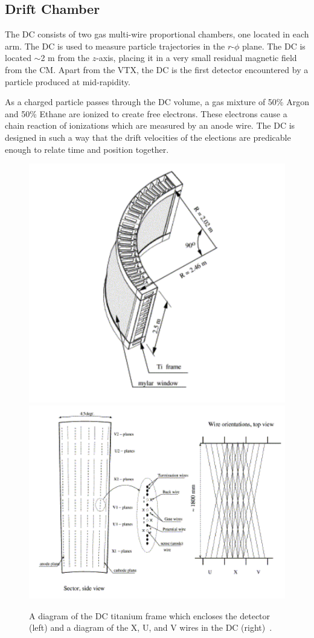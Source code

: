 \subsection{Drift Chamber}
The DC consists of two gas multi-wire proportional chambers, one located in each arm. The DC is used to measure particle trajectories in the $r$-$\phi$ plane.
The DC is located $\sim$2 m from the $z$-axis, placing it in a very small residual magnetic field from the CM. Apart from the VTX, the DC is the first detector encountered by a particle produced at mid-rapidity. 

As a charged particle passes through the DC volume, a gas mixture of 50\% Argon and 50\% Ethane are ionized to create free electrons. These electrons cause a chain reaction of ionizations which are measured by an anode wire. The DC is designed in such a way that the drift velocities of the elections are predicable enough to relate time and position together. 

\begin{figure}[!ht]
\centering
\includegraphics[width=0.45\linewidth]{figs/dc_diagram.png}
\includegraphics[width=0.45\linewidth]{figs/dc_wire_diagram.png}
\caption{A diagram of the DC titanium frame which encloses the detector (left) and a diagram of the X, U, and V wires in the DC (right)~\cite{Adcox2003469}.}
\label{fig:dc_diagram}
\end{figure}

